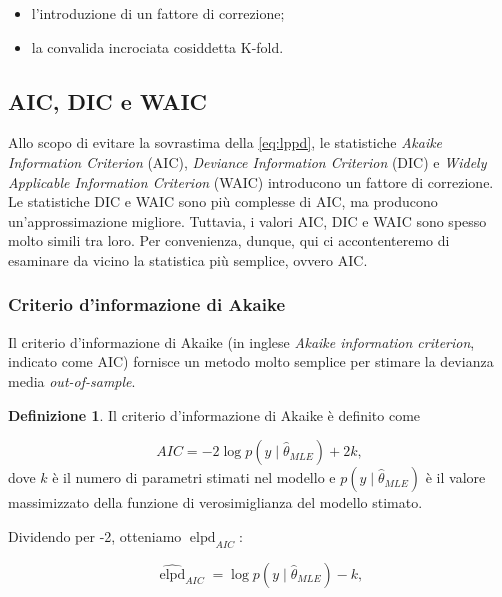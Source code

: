 \documentclass[
  10pt,
  italian,
  a4paper,
  extrafontsizes,onecolumn,openright
  ]{memoir}
\providecommand{\tightlist}{%
  \setlength{\itemsep}{0pt}\setlength{\parskip}{0pt}}
\DeclareMathOperator{\elpd}{elpd} %
\theoremstyle{definition}
\newtheorem{definition}{Definizione}[chapter]
\theoremstyle{definition}
\theoremstyle{definition}
\theoremstyle{definition}
\theoremstyle{remark}
\begin{document}
\begin{itemize}
\tightlist
\item
  l'introduzione di un fattore di correzione;
\item
  la convalida incrociata cosiddetta K-fold.
\end{itemize}

\hypertarget{aic-dic-e-waic}{%
\subsection{AIC, DIC e WAIC}\label{aic-dic-e-waic}}

Allo scopo di evitare la sovrastima della \eqref{eq:lppd}, le statistiche \emph{Akaike Information Criterion} (AIC), \emph{Deviance Information Criterion} (DIC) e \emph{Widely Applicable Information Criterion} (WAIC) introducono un fattore di correzione. Le statistiche DIC e WAIC sono più complesse di AIC, ma producono un'approssimazione migliore. Tuttavia, i valori AIC, DIC e WAIC sono spesso molto simili tra loro. Per convenienza, dunque, qui ci accontenteremo di esaminare da vicino la statistica più semplice, ovvero AIC.

\hypertarget{criterio-dinformazione-di-akaike}{%
\subsubsection{Criterio d'informazione di Akaike}\label{criterio-dinformazione-di-akaike}}

Il criterio d'informazione di Akaike (in inglese \emph{Akaike information criterion}, indicato come AIC) fornisce un metodo molto semplice per stimare la devianza media \emph{out-of-sample}.

\begin{definition}
Il criterio d'informazione di Akaike è definito come

\begin{equation}
AIC = -2 \log p(y \mid \hat{\theta}_{MLE}) + 2k,
\end{equation}
dove \(k\) è il numero di parametri stimati nel modello e \(p(y \mid \hat{\theta}_{MLE})\) è il valore massimizzato della funzione di verosimiglianza del modello stimato.
\end{definition}

\noindent
Dividendo per -2, otteniamo \(\elpd_{AIC}\):

\begin{equation}
\widehat{\elpd}_{AIC} = \log p(y \mid \hat{\theta}_{MLE}) - k,
\end{equation}
\end{document}
